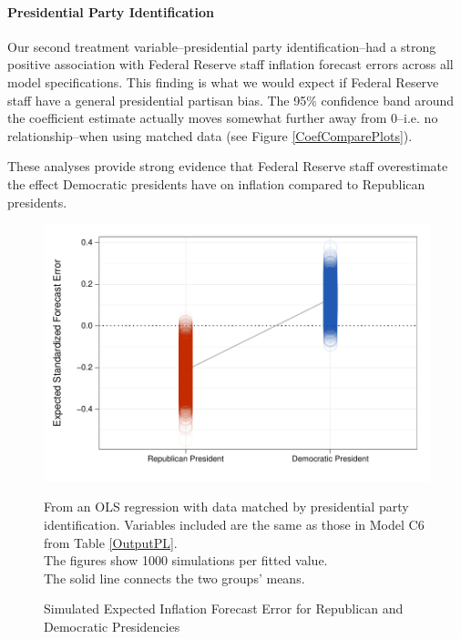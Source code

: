 \documentclass[a4paper]{article}\usepackage{graphicx, color}
\newenvironment{knitrout}{}{} %
\begin{document}
\paragraph{Presidential Party Identification}

Our second treatment variable--presidential party identification--had a strong positive association with Federal Reserve staff inflation forecast errors across all model specifications. This finding is what we would expect if Federal Reserve staff have a general presidential partisan bias. The 95\% confidence band around the coefficient estimate actually moves somewhat further away from 0--i.e. no relationship--when using matched data (see Figure \ref{CoefComparePlots}).  

These analyses provide strong evidence that Federal Reserve staff overestimate the effect Democratic presidents have on inflation compared to Republican presidents.

\begin{figure}[t]
    \caption{Simulated Expected Inflation Forecast Error for Republican and Democratic Presidencies}
    \label{ExpectValueParty}
    \begin{center}

\begin{knitrout}
\color{fgcolor}\includegraphics[width=0.7\linewidth]{figure/ExpectValueParty} 
\end{knitrout}

    \end{center}
    \begin{singlespace}
        {\scriptsize{From an OLS regression with data matched by presidential party identification. Variables included are the same as those in Model C6 from Table \ref{OutputPL}. \\ The figures show 1000 simulations per fitted value. \\ The solid line connects the two groups' means.}}
    \end{singlespace}
\end{figure}
\end{document}

